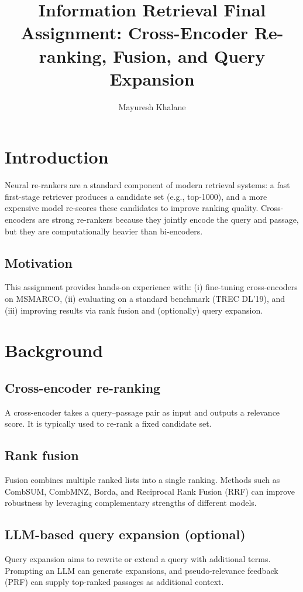 \documentclass[sigconf]{acmart}
\title{Information Retrieval Final Assignment: Cross-Encoder Re-ranking, Fusion, and Query Expansion}
\author{Mayuresh Khalane}
\affiliation{%
  \institution{Information Retrieval (Course Assignment)}
  \city{Your City}
  \country{Your Country}
}
\begin{document}
\maketitle

\section{Introduction}
Neural re-rankers are a standard component of modern retrieval systems: a fast first-stage retriever produces a candidate set (e.g., top-1000), and a more expensive model re-scores these candidates to improve ranking quality. Cross-encoders are strong re-rankers because they jointly encode the query and passage, but they are computationally heavier than bi-encoders.

\subsection{Motivation}
This assignment provides hands-on experience with: (i) fine-tuning cross-encoders on MSMARCO, (ii) evaluating on a standard benchmark (TREC DL'19), and (iii) improving results via rank fusion and (optionally) query expansion.

\section{Background}
\subsection{Cross-encoder re-ranking}
A cross-encoder takes a query--passage pair as input and outputs a relevance score. It is typically used to re-rank a fixed candidate set.

\subsection{Rank fusion}
Fusion combines multiple ranked lists into a single ranking. Methods such as CombSUM, CombMNZ, Borda, and Reciprocal Rank Fusion (RRF) can improve robustness by leveraging complementary strengths of different models.

\subsection{LLM-based query expansion (optional)}
Query expansion aims to rewrite or extend a query with additional terms. Prompting an LLM can generate expansions, and pseudo-relevance feedback (PRF) can supply top-ranked passages as additional context.
\end{document}
